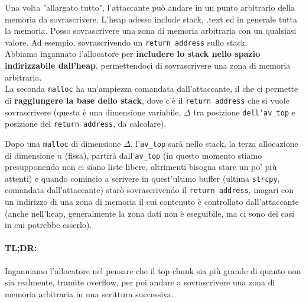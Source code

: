 Una volta "allargato tutto", l'attaccante può andare in un punto arbitrario della memoria da sovrascrivere. L'heap adesso include stack, .text ed in generale tutta la memoria. Posso sovrascrivere una zona di memoria arbitraria con un qualsiasi valore. Ad esempio, sovrascrivendo un \texttt{return address} sullo stack.\\

Abbiamo ingannato l'allocatore per \textbf{includere lo stack nello spazio indirizzabile dall'heap}, permettendoci di sovrascrivere una zona di memoria arbitraria.\\

La seconda \texttt{malloc} ha un'ampiezza comandata dall'attaccante, il che ci permette di \textbf{raggiungere la base dello stack}, dove c'è il \texttt{return address} che si vuole sovrascrivere (questa è una dimensione variabile, $\Delta$ tra posizione \texttt{dell'av\_top} e posizione del \texttt{return address}, da calcolare).\\

\newpage

Dopo una \texttt{malloc} di dimensione $\Delta$, l'\texttt{av\_top} sarà nello stack, la terza allocazione di dimensione $n$ (fissa), partirà dall'\texttt{av\_top} (in questo momento stiamo presupponendo non ci siano liste libere, altrimenti bisogna stare un po' più attenti) e quando comincio a scrivere in quest'ultimo buffer (ultima \texttt{strcpy}, comandata dall'attaccante) starò sovrascrivendo il \texttt{return address}, magari con un indirizzo di una zona di memoria il cui contenuto è controllato dall'attaccante (anche nell'heap, generalmente la zona dati non è eseguibile, ma ci sono dei casi in cui potrebbe esserlo).\\

\vfill 

\paragraph{TL;DR:} Inganniamo l'allocatore nel pensare che il top chunk sia più grande di quanto non sia realmente, tramite overflow, per poi andare a sovrascrivere una zona di memoria arbitraria in una scrittura successiva.\\

